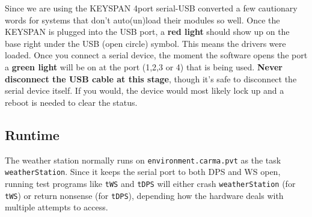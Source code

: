 \documentclass[11pt]{article}
\begin{document}
Since we are using the KEYSPAN 4port serial-USB converted a few cautionary
words for systems that don't auto(un)load their modules
so well. Once the KEYSPAN is plugged
into the USB port, a {\bf red light} should show up on the base right under the USB
(open circle) symbol. This means the drivers were loaded. Once you
connect a serial device, the moment the software opens the port
a {\bf green light} will be on
at the port (1,2,3 or 4) that is being used. 
{\bf Never disconnect the USB cable at this stage}, 
though it's safe to disconnect the serial device itself. If you would, the
device would most likely lock up and a reboot is needed to clear the status.

\subsection{Runtime}

The weather station normally runs on {\tt environment.carma.pvt} as the task
{\tt weatherStation}. Since it keeps the serial port to both DPS and WS open,
running test programs like {\tt tWS} and {\tt tDPS} will either crash
{\tt weatherStation} (for {\tt tWS}) or
return nonsense (for {\tt tDPS}), depending how the hardware deals with
multiple attempts to access.
\end{document}
